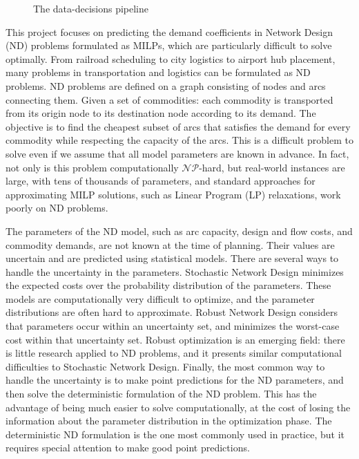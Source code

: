 \begin{figure}[ht]
    \centering
    
    \caption{The data-decisions pipeline}
    \label{fig:intro:data-decisions}
\end{figure}

This project focuses on predicting the demand coefficients in Network Design (ND) problems formulated as MILPs, which are particularly difficult to solve optimally.  From railroad scheduling to city logistics to airport hub placement, many problems in transportation and logistics can be formulated as ND problems. ND problems are defined on a graph consisting of nodes and arcs connecting them. Given a set of commodities: each commodity is transported from its origin node to its destination node according to its demand. The objective is to find the cheapest subset of arcs that satisfies the demand for every commodity while respecting the capacity of the arcs. This is a difficult problem to solve even if we assume that all model parameters are known in advance. In fact, not only is this problem computationally $\mathcal{NP}$-hard, but real-world instances are large, with tens of thousands of parameters, and standard approaches for approximating MILP solutions, such as Linear Program (LP) relaxations, work poorly on ND problems. 

The parameters of the ND model, such as arc capacity, design and flow costs, and commodity demands, are not known at the time of planning. Their values are uncertain and are predicted using statistical models. There are several ways to handle the uncertainty in the parameters. Stochastic Network Design \citep{alonso-ayusoApproachStrategicSupply2003} minimizes the expected costs over the probability distribution of the parameters. These models are computationally very difficult to optimize, and the parameter distributions are often hard to approximate. Robust Network Design \citep{kosterRobustNetworkDesign2013} considers that parameters occur within an uncertainty set, and minimizes the worst-case cost within that uncertainty set. Robust optimization is an emerging field: there is little research applied to ND problems, and it presents similar computational difficulties to Stochastic Network Design. Finally, the most common way to handle the uncertainty is to make point predictions for the ND parameters, and then solve the deterministic formulation of the ND problem. This has the advantage of being much easier to solve computationally, at the cost of losing the information about the parameter distribution in the optimization phase. The deterministic ND formulation is the one most commonly used in practice, but it requires special attention to make good point predictions.

